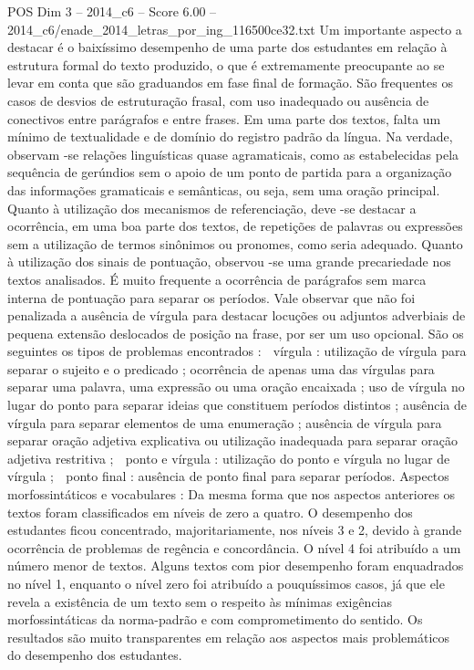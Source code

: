 \begin{textsample}{POS Dim 3 – 2014\_c6 – Score 6.00 – 2014\_c6/enade\_2014\_letras\_por\_ing\_116500ce32.txt}
Um importante aspecto a destacar é o baixíssimo desempenho de uma parte dos estudantes em relação à estrutura formal do texto produzido, o que é extremamente preocupante ao se levar em conta que são graduandos em fase final de formação.
São frequentes os casos de desvios de estruturação frasal, com uso inadequado ou ausência de conectivos entre parágrafos e entre frases.
Em uma parte dos textos, falta um mínimo de textualidade e de domínio do registro padrão da língua.
Na verdade, observam -se relações linguísticas quase agramaticais, como as estabelecidas pela sequência de gerúndios sem o apoio de um ponto de partida para a organização das informações gramaticais e semânticas, ou seja, sem uma oração principal.
Quanto à utilização dos mecanismos de referenciação, deve -se destacar a ocorrência, em uma boa parte dos textos, de repetições de palavras ou expressões sem a utilização de termos sinônimos ou pronomes, como seria adequado.
Quanto à utilização dos sinais de pontuação, observou -se uma grande precariedade nos textos analisados.
É muito frequente a ocorrência de parágrafos sem marca interna de pontuação para separar os períodos.
Vale observar que não foi penalizada a ausência de vírgula para destacar locuções ou adjuntos adverbiais de pequena extensão deslocados de posição na frase, por ser um uso opcional.
São os seguintes os tipos de problemas encontrados :  vírgula : utilização de vírgula para separar o sujeito e o predicado ; ocorrência de apenas uma das vírgulas para separar uma palavra, uma expressão ou uma oração encaixada ; uso de vírgula no lugar do ponto para separar ideias que constituem períodos distintos ; ausência de vírgula para separar elementos de uma enumeração ; ausência de vírgula para separar oração adjetiva explicativa ou utilização inadequada para separar oração adjetiva restritiva ;  ponto e vírgula : utilização do ponto e vírgula no lugar de vírgula ;  ponto final : ausência de ponto final para separar períodos.
Aspectos morfossintáticos e vocabulares : Da mesma forma que nos aspectos anteriores os textos foram classificados em níveis de zero a quatro.
O desempenho dos estudantes ficou concentrado, majoritariamente, nos níveis 3 e 2, devido à grande ocorrência de problemas de regência e concordância.
O nível 4 foi atribuído a um número menor de textos.
Alguns textos com pior desempenho foram enquadrados no nível 1, enquanto o nível zero foi atribuído a pouquíssimos casos, já que ele revela a existência de um texto sem o respeito às mínimas exigências morfossintáticas da norma-padrão e com comprometimento do sentido.
Os resultados são muito transparentes em relação aos aspectos mais problemáticos do desempenho dos estudantes.

\end{textsample}
